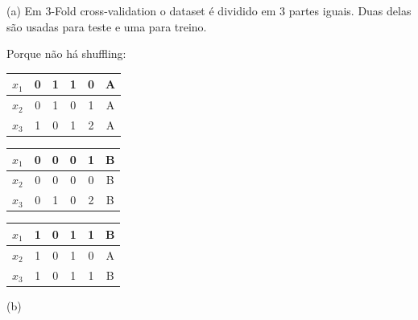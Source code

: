 \documentclass[a4paper,12pt]{article} %
\begin{document}
\begin{enumerate}
(a)
Em 3-Fold cross-validation o dataset é dividido em 3 partes iguais. Duas delas são usadas para teste e uma para treino.

Porque não há shuffling:

\begin{table}[H]
    \begin{minipage}[b]{0.3\linewidth}
    \centering
    \begin{tabular}{cccccc}
        $x_1$ & 0 & 1 & 1 & 0 & A \\ \hline
        $x_2$ & 0 & 1 & 0 & 1 & A \\ \hline
        $x_3$ & 1 & 0 & 1 & 2 & A
        \end{tabular}
    \end{minipage}
    \hfill
    \begin{minipage}[b]{0.3\linewidth}
    \centering
    \begin{tabular}{cccccc}
        $x_1$ & 0 & 0 & 0 & 1 & B \\ \hline
        $x_2$ & 0 & 0 & 0 & 0 & B \\ \hline
        $x_3$ & 0 & 1 & 0 & 2 & B
        \end{tabular}
    \end{minipage}
    \hfill
    \begin{minipage}[b]{0.3\linewidth}
    \centering
    \begin{tabular}{cccccc}
        $x_1$ & 1 & 0 & 1 & 1 & B \\ \hline
        $x_2$ & 1 & 0 & 1 & 0 & A \\ \hline
        $x_3$ & 1 & 0 & 1 & 1 & B
        \end{tabular}
    \end{minipage}
    \hfill

\end{table}

(b)


\end{enumerate}
\end{document}

